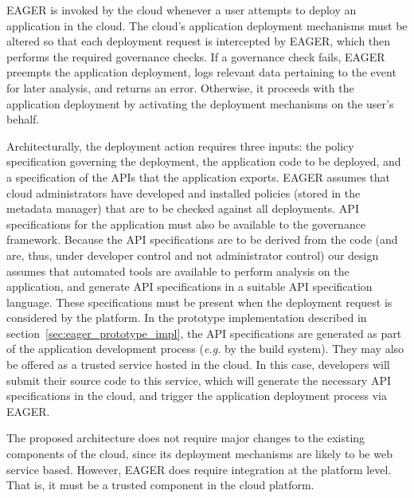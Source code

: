 EAGER is invoked by the cloud whenever a user
attempts to deploy an application in the cloud.
The cloud's application deployment mechanisms must be altered so that
each deployment request is
intercepted by EAGER, which then performs the required governance checks.
If a governance check fails, EAGER preempts the application deployment,
logs relevant data pertaining to the event for later analysis,  and
returns an error. Otherwise, it proceeds with the application deployment by
activating the deployment mechanisms on the user's 
behalf. 

Architecturally, the deployment action requires three inputs: the policy
specification governing the deployment, the application code to be deployed, and a
specification of the APIs that the application exports.
EAGER assumes that cloud administrators have developed and installed policies
(stored in the metadata manager)
that are to be checked against all deployments.  API specifications for the
application must also be available to the governance framework.  Because the API
specifications are to be derived from the code (and are, thus, under developer
control and not administrator control) our design assumes that automated
tools are available
to perform analysis on the application, and
generate API specifications in a suitable API specification language. These
specifications must be present
when the deployment request is considered by the platform.  In the prototype
implementation described in section~\ref{sec:eager_prototype_impl}, the API specifications are
generated as part of the application development process ({\em e.g.} by the
build system).  They may also
be offered as a trusted service hosted in the cloud. 
In this case, developers will submit their source code
to this service, which will generate the necessary API specifications in the cloud, and trigger
the application deployment process via EAGER.

The proposed architecture does not require major changes to the 
existing components of the cloud, since its deployment mechanisms are likely to
be web service based.  However, EAGER does require integration at the platform level.
That is, it must be a trusted component in the cloud platform. 

